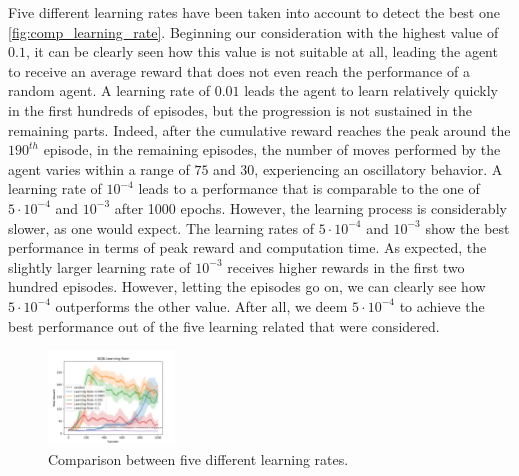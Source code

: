 \documentclass{article}
\begin{document}
Five different learning rates have been taken into account to detect the best one \autoref{fig:comp_learning_rate}. 
Beginning our consideration with the highest value of $0.1$, it can be clearly seen how this value is not suitable at all, 
leading the agent to receive an average reward that does not even reach the performance of a random agent. 
A learning rate of $0.01$ leads the agent to learn relatively quickly in the first hundreds of episodes, 
but the progression is not sustained in the remaining parts. 
Indeed, after the cumulative reward reaches the peak around the $190^{th}$ episode, in the remaining episodes, the number of moves performed by the agent varies within a range of $75$ and $30$, experiencing an oscillatory behavior. 
A learning rate of $10^{-4}$ leads to a performance that is comparable to the one of $5 \cdot 10^{-4}$ and $10^{-3}$ after 1000 epochs. 
However, the learning process is considerably slower, as one would expect.
The learning rates of $5 \cdot 10^{-4}$ and $10^{-3}$ show the best performance in terms of peak reward and computation time. 
As expected, the slightly larger learning rate of $10^{-3}$ 
receives higher rewards in the first two hundred episodes. 
However, letting the episodes go on, we can clearly see how $5 \cdot 10^{-4}$ outperforms the other value.
After all, we deem $5 \cdot 10^{-4}$ to achieve the best performance out of the five learning related that were considered.

\begin{figure}[ht!]
   \centering
   \includegraphics[width=0.3\textwidth]{assets/fig_hp/learning_rate.png}
   \caption{Comparison between five different learning rates. 
   }
   \label{fig:comp_learning_rate}
\end{figure}
 
\end{document}
